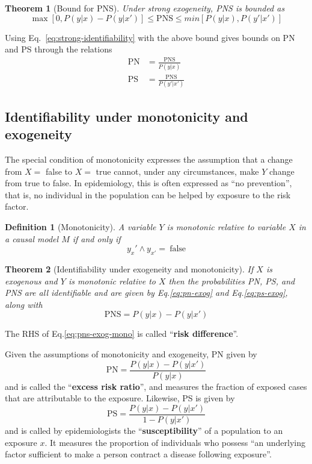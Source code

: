 \documentclass[11pt]{article}
\numberwithin{equation}{section}
\newtheorem{thm}{Theorem}[section]
\newtheorem{defn}{Definition}[section]
\begin{document}
\begin{thm}[Bound for PNS]
Under strong exogeneity, PNS is bounded as 
\begin{equation}
\max[0, P(y|x) - P(y|x')] \leq \text{PNS} \leq min[P(y|x), P(y'|x')]
\end{equation}
\end{thm}

Using Eq.~\eqref{eq:strong-identifiability} with the above bound gives bounds on PN and PS through the relations
\begin{align}
\text{PN}&=\frac{\text{PNS}}{P(y|x)} \label{eq:pn-exog}\\
\text{PS}&=\frac{\text{PNS}}{P(y'|x')} \label{eq:ps-exog}
\end{align}

\subsection{Identifiability under monotonicity and exogeneity}
The special condition of monotonicity expresses the assumption that a change from $X=$ false to $X=$ true cannot, under any circumstances, make $Y$ change from true to false. In epidemiology, this is often expressed as ``no prevention'', that is, no individual in the population can be helped by exposure to the risk factor.
\begin{defn}[Monotonicity]
A variable $Y$ is monotonic relative to variable $X$ in a causal model $M$ if and only if 
\begin{equation}
y_x' \wedge y_{x'}=\ \text{false}
\end{equation}
\end{defn}

\begin{thm}[Identifiability under exogeneity and monotonicity]
If $X$ is exogenous and $Y$ is monotonic relative to $X$ then the probabilities PN, PS, and PNS are all identifiable and are given by Eq.\eqref{eq:pn-exog} and Eq.\eqref{eq:ps-exog}, along with
\begin{equation}
\text{PNS}=P(y|x) - P(y|x') \label{eq:pns-exog-mono}
\end{equation}
\end{thm}
\noindent The RHS of Eq.\eqref{eq:pns-exog-mono} is called ``\textbf{risk difference}''. 

Given the assumptions of monotonicity and exogeneity, PN given by
\begin{equation}
\text{PN}=\frac{P(y|x)-P(y|x')}{P(y|x)}
\end{equation}
and is called the ``\textbf{excess risk ratio}'', and measures the fraction of exposed cases that are attributable to the exposure. Likewise, PS is given by
\begin{equation}
\text{PS}=\frac{P(y|x)-P(y|x')}{1-P(y|x')}
\end{equation}
and is called by epidemiologists the ``\textbf{susceptibility}'' of a population to an exposure $x$. It measures the proportion of individuals who possess ``an underlying factor sufficient to make a person contract a disease following exposure''.
\end{document}
